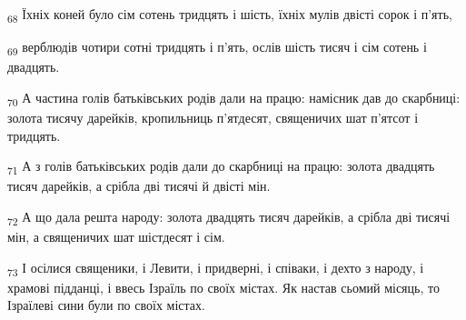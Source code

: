 \begin{tcolorbox}
\textsubscript{68} Їхніх коней було сім сотень тридцять і шість, їхніх мулів двісті сорок і п'ять,
\end{tcolorbox}
\begin{tcolorbox}
\textsubscript{69} верблюдів чотири сотні тридцять і п'ять, ослів шість тисяч і сім сотень і двадцять.
\end{tcolorbox}
\begin{tcolorbox}
\textsubscript{70} А частина голів батьківських родів дали на працю: намісник дав до скарбниці: золота тисячу дарейків, кропильниць п'ятдесят, священичих шат п'ятсот і тридцять.
\end{tcolorbox}
\begin{tcolorbox}
\textsubscript{71} А з голів батьківських родів дали до скарбниці на працю: золота двадцять тисяч дарейків, а срібла дві тисячі й двісті мін.
\end{tcolorbox}
\begin{tcolorbox}
\textsubscript{72} А що дала решта народу: золота двадцять тисяч дарейків, а срібла дві тисячі мін, а священичих шат шістдесят і сім.
\end{tcolorbox}
\begin{tcolorbox}
\textsubscript{73} І осілися священики, і Левити, і придверні, і співаки, і дехто з народу, і храмові підданці, і ввесь Ізраїль по своїх містах. Як настав сьомий місяць, то Ізраїлеві сини були по своїх містах.
\end{tcolorbox}
